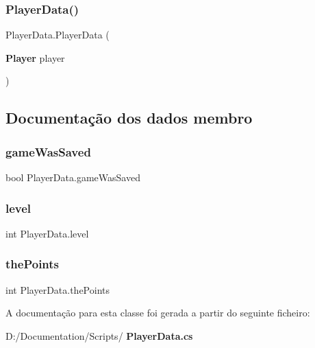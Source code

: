 \subsubsection{PlayerData()}
{\footnotesize\ttfamily Player\+Data.\+Player\+Data (\begin{DoxyParamCaption}\item[{\textbf{ Player}}]{player }\end{DoxyParamCaption})}



\subsection{Documentação dos dados membro}
\mbox{\label{class_player_data_aefee7df606db56d47e71290cf7110d22}} 
\subsubsection{gameWasSaved}
{\footnotesize\ttfamily bool Player\+Data.\+game\+Was\+Saved}

\mbox{\label{class_player_data_a533cced302f23144fcd25e58a04e96e4}} 
\subsubsection{level}
{\footnotesize\ttfamily int Player\+Data.\+level}

\mbox{\label{class_player_data_ace4c3d2afef87f4c3afb760ddbec8139}} 
\subsubsection{thePoints}
{\footnotesize\ttfamily int Player\+Data.\+the\+Points}



A documentação para esta classe foi gerada a partir do seguinte ficheiro\+:\begin{DoxyCompactItemize}
\item 
D\+:/\+Documentation/\+Scripts/\textbf{ Player\+Data.\+cs}\end{DoxyCompactItemize}
